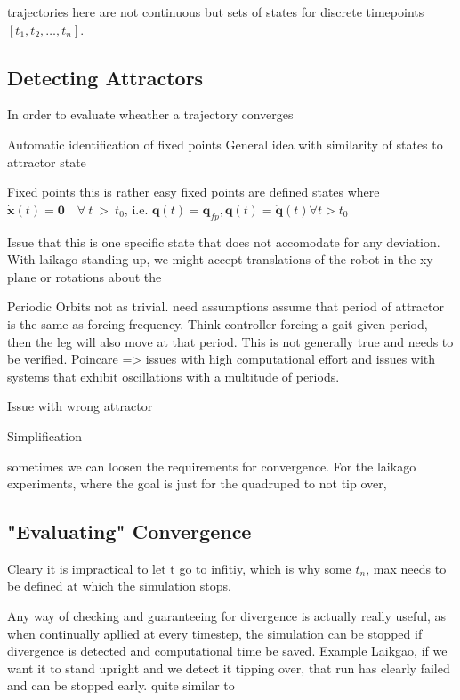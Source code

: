 trajectories here are not continuous but sets of states for discrete timepoints $[t_1,t_2,\ldots, t_n]$. 


\subsection{Detecting Attractors}

In order to evaluate wheather a trajectory converges 
    
Automatic identification of fixed points
    General idea with similarity of states to attractor state

    Fixed points
    this is rather easy
    fixed points are defined states where $\dot{\mathbf{x}}(t) = \mathbf{0} \quad \forall \ t\  >\  t_0 $, i.e. $\mathbf{q}(t)=\mathbf{q}_{fp}, \dot{\mathbf{q}}(t) = \ddot{\mathbf{q}}(t)  \forall t > t_0$

    Issue that this is one specific state that does not accomodate for any deviation. With laikago standing up, we might accept translations of the robot in the xy-plane or rotations about the 

    Periodic Orbits
        not as trivial. need assumptions
        assume that period of attractor is the same as forcing frequency. Think controller forcing a gait given period, then the leg will also move at that period. This is not generally true and needs to be verified. 
        Poincare => issues with high computational effort and issues with systems that exhibit oscillations with a multitude of periods. 

    Issue with wrong attractor

    Simplification

    sometimes we can loosen the requirements for convergence. For the laikago experiments, where the goal is just for the quadruped to not tip over, 


\subsection{"Evaluating" Convergence}
    
    Cleary it is impractical to let t go to infitiy, which is why some $t_n$, max needs to be defined at which the simulation stops. 

    Any way of checking and guaranteeing for divergence is actually really useful, as when continually apllied at every timestep, the simulation can be stopped if divergence is detected and computational time be saved. Example Laikgao, if we want it to stand upright and we detect it tipping over, that run has clearly failed and can be stopped early. 
    quite similar to 

